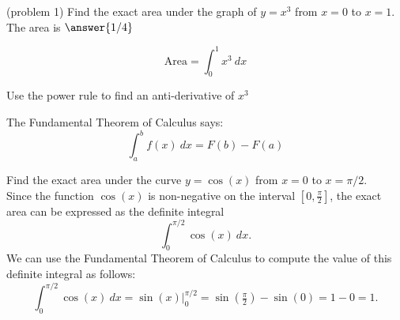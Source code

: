 \documentclass[handout]{ximera}
\begin{document}
\begin{problem}(problem 1)
Find the exact area under the graph of $y = x^3$ from $x = 0$ to $x = 1$.\\
The area is $\answer{1/4}$

\begin{hint}
  \[
  \text{Area} = \int_0^{1} x^3 \ dx 
  \]
\end{hint}
    \begin{hint}
      Use the power rule to find an anti-derivative of $x^3$
    \end{hint}
    
    \begin{hint}
      The Fundamental Theorem of Calculus says:
      \[
      \int_a^b f(x) \ dx = F(b) - F(a)
      \]
    \end{hint}    
		
		
\end{problem}



\begin{example}[example 2]
Find the exact area under the curve $y = \cos(x)$ from $x=0$ to $x= \pi/2$.\\
Since the function $\cos(x)$ is non-negative on the interval $[0, \frac{\pi}{2}]$, the exact area can be expressed as the definite integral
\[\int_0^{\pi/2} \cos(x) \ dx.\]
We can use the Fundamental Theorem of Calculus to compute the value of this definite integral as follows:
\[\int_0^{\pi/2} \cos(x) \ dx = \sin(x) \Big|_0^{\pi/2} = \sin(\tfrac{\pi}{2}) - \sin(0)= 1- 0 = 1.\]


\begin{image}
\end{image}

\end{example}
\end{document}
